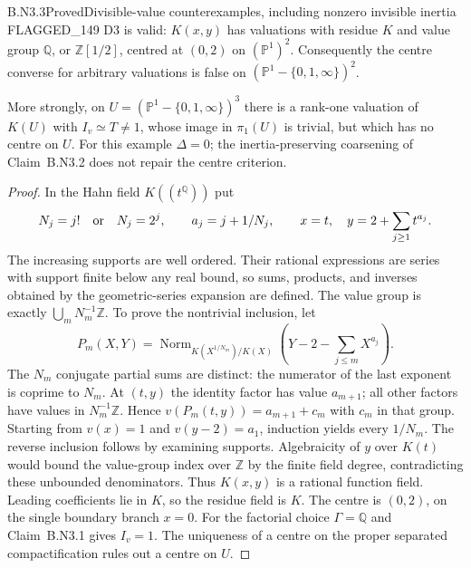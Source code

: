 \begin{claim}{B.N3.3}{Proved}{Divisible-value counterexamples, including nonzero invisible inertia}
FLAGGED\_149 D3 is valid: $K(x,y)$ has valuations with residue $K$
and value group $\mathbb Q$, or $\mathbb Z[1/2]$, centred at $(0,2)$
on $(\mathbb P^1)^2$.  Consequently the centre converse for arbitrary
valuations is false on $(\mathbb P^1-\{0,1,\infty\})^2$.

More strongly, on
$U=(\mathbb P^1-\{0,1,\infty\})^3$ there is a rank-one valuation
of $K(U)$ with $I_v\simeq T\ne1$, whose image in $\pi_1(U)$ is
trivial, but which has no centre on $U$.  For this example
$\Delta=0$; the inertia-preserving coarsening of Claim~B.N3.2 does
not repair the centre criterion.
\end{claim}
\begin{proof}
In the Hahn field $K((t^{\mathbb Q}))$ put
\[
 N_j=j!\quad\hbox{or}\quad N_j=2^j,\qquad
 a_j=j+1/N_j,\qquad x=t,\quad y=2+\sum_{j\ge1}t^{a_j}.
\]
The increasing supports are well ordered.  Their rational expressions
are series with support finite below any real bound, so sums,
products, and inverses obtained by the geometric-series expansion
are defined.  The value group is exactly
$\bigcup_m N_m^{-1}\mathbb Z$.  To prove the nontrivial inclusion,
let
\[
 P_m(X,Y)=\operatorname{Norm}_{K(X^{1/N_m})/K(X)}
 \left(Y-2-\sum_{j\le m}X^{a_j}\right).
\]
The $N_m$ conjugate partial sums are distinct: the numerator of the
last exponent is coprime to $N_m$.  At $(t,y)$ the identity factor
has value $a_{m+1}$; all other factors have values in
$N_m^{-1}\mathbb Z$.  Hence
$v(P_m(t,y))=a_{m+1}+c_m$ with $c_m$ in that group.  Starting from
$v(x)=1$ and $v(y-2)=a_1$, induction yields every $1/N_m$.
The reverse inclusion follows by examining supports.  Algebraicity
of $y$ over $K(t)$ would bound the value-group index over
$\mathbb Z$ by the finite field degree, contradicting these
unbounded denominators.  Thus $K(x,y)$ is a rational function field.
Leading coefficients lie in $K$, so the residue field is $K$.
The centre is $(0,2)$, on the single boundary branch $x=0$.
For the factorial choice $\Gamma=\mathbb Q$ and
Claim~B.N3.1 gives $I_v=1$.  The uniqueness of a centre on the
proper separated compactification rules out a centre on $U$.


\end{proof}
